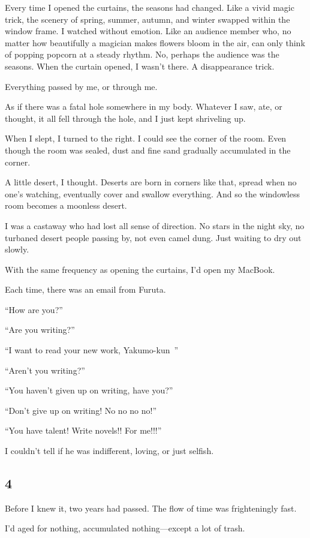 \documentclass[
    a4paper,
    12pt,
    twoside,
    openany,
    UTF8,
    fontset=windows
]{ctexbook}
\begin{document}
Every time I opened the curtains, the seasons had changed. Like a vivid magic trick, the scenery of spring, summer, autumn, and winter swapped within the window frame. I watched without emotion. Like an audience member who, no matter how beautifully a magician makes flowers bloom in the air, can only think of popping popcorn at a steady rhythm. No, perhaps the audience was the seasons. When the curtain opened, I wasn't there. A disappearance trick.

Everything passed by me, or through me.

As if there was a fatal hole somewhere in my body. Whatever I saw, ate, or thought, it all fell through the hole, and I just kept shriveling up.

When I slept, I turned to the right. I could see the corner of the room. Even though the room was sealed, dust and fine sand gradually accumulated in the corner.

A little desert, I thought. Deserts are born in corners like that, spread when no one's watching, eventually cover and swallow everything. And so the windowless room becomes a moonless desert.

I was a castaway who had lost all sense of direction. No stars in the night sky, no turbaned desert people passing by, not even camel dung. Just waiting to dry out slowly.

With the same frequency as opening the curtains, I'd open my MacBook.

Each time, there was an email from Furuta.

``How are you?''

``Are you writing?''

``I want to read your new work, Yakumo-kun~''

``Aren't you writing?''

``You haven't given up on writing, have you?''

``Don't give up on writing! No no no no!''

``You have talent! Write novels!! For me!!!''

I couldn't tell if he was indifferent, loving, or just selfish.


\subsection*{4}

Before I knew it, two years had passed. The flow of time was frighteningly fast.

I'd aged for nothing, accumulated nothing---except a lot of trash.
\end{document}
